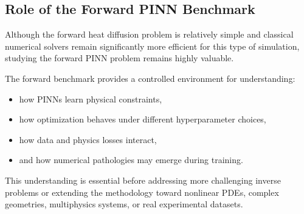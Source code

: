 \subsection{Role of the Forward PINN Benchmark}

Although the forward heat diffusion problem is relatively simple and classical numerical solvers remain significantly more efficient for this type of simulation, studying the forward PINN problem remains highly valuable.

The forward benchmark provides a controlled environment for understanding:
\begin{itemize}
    \item how PINNs learn physical constraints,
    \item how optimization behaves under different hyperparameter choices,
    \item how data and physics losses interact,
    \item and how numerical pathologies may emerge during training.
\end{itemize}

This understanding is essential before addressing more challenging inverse problems or extending the methodology toward nonlinear PDEs, complex geometries, multiphysics systems, or real experimental datasets.